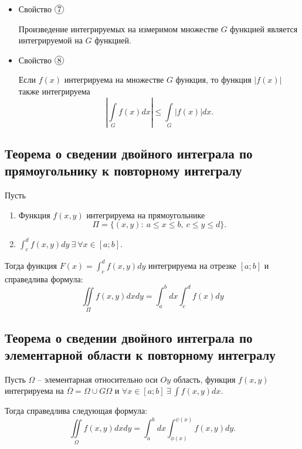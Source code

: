 \begin{itemize}
    \item Свойство $ \circled{7} $
          \begin{statement}
              Произведение интегрируемых на измеримом множестве $ G $ функцией является интегрируемой на $ G $ функцией.
          \end{statement}

    \item Свойство $ \circled{8} $
          \begin{statement}
              Если $ f(x) $ интегрируема на множестве $ G $ функция, то функция $ \big| f(x) \big| $ также интегрируема
              \[
                  \left|\underset{G}{\int}f(x)dx\right| \leqslant \underset{G}{\int}\big|f(x)\big|dx.
              \]
          \end{statement}
\end{itemize}

\subsection{Теорема о сведении двойного интеграла по прямоугольнику к повторному интегралу}

\begin{theorem}
    Пусть
    \begin{enumerate}
        \item Функция $ f(x,y) $ интегрируема на прямоугольнике
              \[
                  \Pi = \big\{(x,y): \ a \leqslant x \leqslant b, \ c \leqslant y \leqslant d\big\}.
              \]

        \item $ \int_{c}^{d}f(x,y)dy \ \exists \ \forall x \in [a;b] $.
    \end{enumerate}

    Тогда функция $ F(x) = \int_{c}^{d}f(x,y)dy $ интегрируема на отрезке $ [a;b] $ и справедлива формула:
    \[
        \boxed{\iint\limits_\Pi f(x,y)dxdy = \int_{a}^{b}dx \int_{c}^{d}f(x)dy}
    \]
\end{theorem}

\subsection{Теорема о сведении двойного интеграла по элементарной области к повторному интегралу}

\begin{theorem}
    Пусть $ \Omega $ -- элементарная относительно оси $ Oy $ область, функция $ f(x,y) $ интегрируема на $ \overline{\Omega} = \Omega \cup G\Omega $ и $ \forall x \in [a;b] \ \exists \ \int f(x,y)dx $.

    Тогда справедлива следующая формула:
    \begin{equation}\label{eq:for_proof9}
        \iint\limits_\Omega f(x,y)dxdy = \int_{a}^{b}dx \int_{\phi(x)}^{\psi(x)}f(x,y)dy.
    \end{equation}
\end{theorem}

